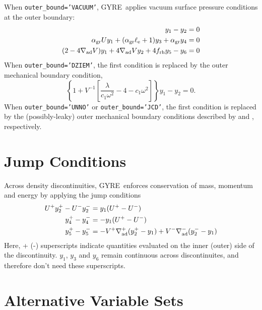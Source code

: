 \documentclass[fleqn]{article}
\newcommand{\gyre}{GYRE}
\newcommand{\elle}{\ell_{\rm e}}
\newcommand{\nabad}{\nabla_{\rm ad}}
\newcommand{\agr}{\alpha_{\rm gr}}
\newcommand{\frh}{f_{\rm rh}}
\begin{document}
When \texttt{outer\_bound='VACUUM'}, \gyre\ applies vacuum surface
pressure conditions at the outer boundary:
\begin{align*}
y_{1} - y_{2} &= 0 \\
\agr U y_{1} + (\agr \elle + 1) y_{3} + \agr y_{4} &= 0 \\
(2 - 4\nabad V) y_{1} + 4 \nabad V y_{2} + 4 \frh y_{5} - y_{6} &= 0
\end{align*}
When \texttt{outer\_bound='DZIEM'}, the first condition is replaced by
the \citet{Dziembowski:1971aa} outer mechanical boundary condition,
\begin{equation*}
\left\{ 1 + V^{-1} \left[ \frac{\lambda}{c_{1} \omega^{2}} - 4 - c_{1} \omega^{2} \right] \right\} y_{1} -
y_{2} = 0.
\end{equation*}
When \texttt{outer\_bound='UNNO'} or \texttt{outer\_bound='JCD'}, the
first condition is replaced by the (possibly-leaky) outer mechanical
boundary conditions described by \citet{Unno:1989aa} and
\citet{Christensen-Dalsgaard:2008ab}, respectively.
  
\section*{Jump Conditions}

Across density discontinuities, \gyre\ enforces conservation of mass,
momentum and energy by applying the jump conditions
\begin{align*}
U^{+} y_{2}^{+} - U^{-} y_{2}^{-} &= y_{1} (U^{+} - U^{-}) \\
y_{4}^{+} - y_{4}^{-} &= -y_{1} (U^{+} - U^{-}) \\
y_{5}^{+} - y_{5}^{-} &= - V^{+} \nabad^{+} (y_{2}^{+} - y_{1}) +
V^{-} \nabad^{-} (y_{2}^{-} - y_{1})
\end{align*}
Here, + (-) superscripts indicate quantities evaluated on the inner
(outer) side of the discontinuity. $y_{1}$, $y_{3}$ and $y_{6}$ remain
continuous across discontinuites, and therefore don't need these
superscripts.

\section*{Alternative Variable Sets}
\end{document}

